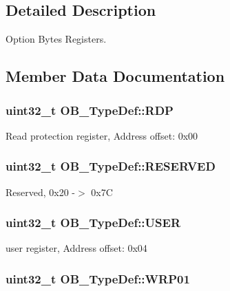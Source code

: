 \subsection{Detailed Description}
Option Bytes Registers. 

\subsection{Member Data Documentation}
\hypertarget{struct_o_b___type_def_a431dc8b09670085199c380017243c0ea}{
\subsubsection[{R\-D\-P}]{ uint32\-\_\-t O\-B\-\_\-\-Type\-Def\-::\-R\-D\-P}}\label{struct_o_b___type_def_a431dc8b09670085199c380017243c0ea}
Read protection register, Address offset\-: 0x00 \hypertarget{struct_o_b___type_def_abdb0d4bf1daca662a75a6fbed065e887}{
\subsubsection[{R\-E\-S\-E\-R\-V\-E\-D}]{\setlength{\rightskip}{0pt plus 5cm}uint32\-\_\-t O\-B\-\_\-\-Type\-Def\-::\-R\-E\-S\-E\-R\-V\-E\-D}}\label{struct_o_b___type_def_abdb0d4bf1daca662a75a6fbed065e887}
Reserved, 0x20 -\/$>$ 0x7\-C \hypertarget{struct_o_b___type_def_a21dbc215f1bc3a7b2d26538a7a5fdfdd}{
\subsubsection[{U\-S\-E\-R}]{ uint32\-\_\-t O\-B\-\_\-\-Type\-Def\-::\-U\-S\-E\-R}}\label{struct_o_b___type_def_a21dbc215f1bc3a7b2d26538a7a5fdfdd}
user register, Address offset\-: 0x04 \hypertarget{struct_o_b___type_def_a6db927d69c0fa4753d732278702f5ba1}{
\subsubsection[{W\-R\-P01}]{ uint32\-\_\-t O\-B\-\_\-\-Type\-Def\-::\-W\-R\-P01}}\label{struct_o_b___type_def_a6db927d69c0fa4753d732278702f5ba1}
